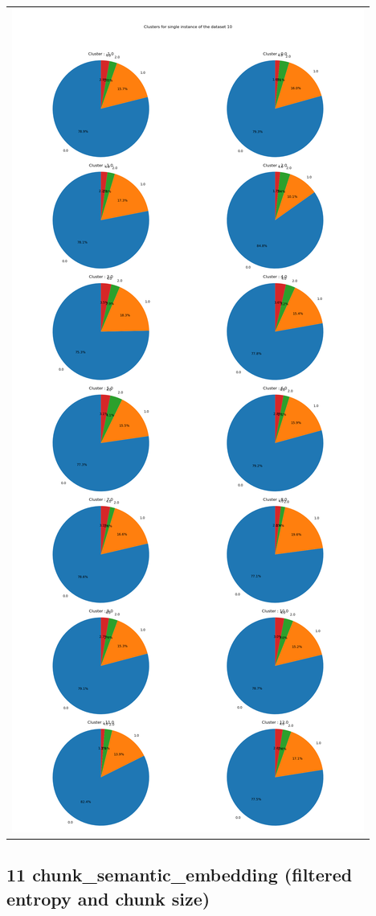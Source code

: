 \begin{longtable}{|c|c|c|c|c|}
\multicolumn{5}{|c|}{\includegraphics[width=0.8\linewidth]{img/annexes/10/clustering_pie_charts/single instance.png}} \\
\end{longtable}


\subsection{11 chunk\_semantic\_embedding (filtered entropy and chunk size)}

